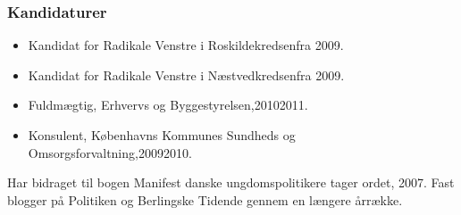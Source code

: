 \documentclass[11pt, a4paper]{awesome-cv}
\begin{document}
\begin{cvletter}
\subsubsection*{Kandidaturer}
\begin{itemize}
\item Kandidat for Radikale Venstre i Roskildekredsenfra 2009.
\item Kandidat for Radikale Venstre i Næstvedkredsenfra 2009.
\end{itemize}
\begin{itemize}
\item Fuldmægtig, Erhvervs og Byggestyrelsen,20102011.
\item Konsulent, Københavns Kommunes Sundheds og Omsorgsforvaltning,20092010.
\end{itemize}
Har bidraget til bogen Manifest  danske ungdomspolitikere tager ordet, 2007. Fast blogger på Politiken og Berlingske Tidende gennem en længere årrække.

\end{cvletter}
\end{document}
